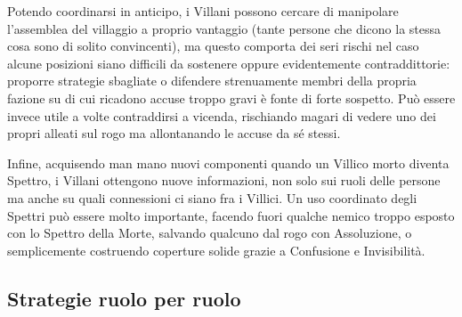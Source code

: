 \documentclass[a4paper,10pt]{article}
\begin{document}
    Potendo coordinarsi in anticipo, i Villani possono cercare di manipolare l'assemblea del villaggio a proprio vantaggio (tante persone che dicono la stessa cosa sono di solito convincenti), ma questo comporta dei seri rischi nel caso alcune posizioni siano difficili da sostenere oppure evidentemente contraddittorie: proporre strategie sbagliate o difendere strenuamente membri della propria fazione su di cui ricadono accuse troppo gravi è fonte di forte sospetto. Può essere invece utile a volte contraddirsi a vicenda, rischiando magari di vedere uno dei propri alleati sul rogo ma allontanando le accuse da sé stessi.
    
    Infine, acquisendo man mano nuovi componenti quando un Villico morto diventa Spettro, i Villani ottengono nuove informazioni, non solo sui ruoli delle persone ma anche su quali connessioni ci siano fra i Villici. Un uso coordinato degli Spettri può essere molto importante, facendo fuori qualche nemico troppo esposto con lo Spettro della Morte, salvando qualcuno dal rogo con Assoluzione, o semplicemente costruendo coperture solide grazie a Confusione e Invisibilità.
    
\subsection{Strategie ruolo per ruolo}
\end{document}
